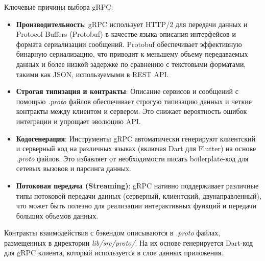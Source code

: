 Ключевые причины выбора gRPC:
\begin{itemize}
    \item \textbf{Производительность}: gRPC использует HTTP/2 для передачи данных и Protocol Buffers (Protobuf) в качестве языка описания интерфейсов и формата сериализации сообщений. Protobuf обеспечивает эффективную бинарную сериализацию, что приводит к меньшему объему передаваемых данных и более низкой задержке по сравнению с текстовыми форматами, такими как JSON, используемыми в REST API.
    \item \textbf{Строгая типизация и контракты}: Описание сервисов и сообщений с помощью \textit{.proto} файлов обеспечивает строгую типизацию данных и четкие контракты между клиентом и сервером. Это снижает вероятность ошибок интеграции и упрощает эволюцию API.
    \item \textbf{Кодогенерация}: Инструменты gRPC автоматически генерируют клиентский и серверный код на различных языках (включая Dart для Flutter) на основе \textit{.proto} файлов. Это избавляет от необходимости писать boilerplate-код для сетевых вызовов и парсинга данных.
    \item \textbf{Потоковая передача (Streaming)}: gRPC нативно поддерживает различные типы потоковой передачи данных (серверный, клиентский, двунаправленный), что может быть полезно для реализации интерактивных функций и передачи больших объемов данных.
\end{itemize}
Контракты взаимодействия с бэкендом описываются в \textit{.proto} файлах, размещенных в директории \textit{lib/src/proto/}. На их основе генерируется Dart-код для gRPC клиента, который используется в слое данных приложения.





